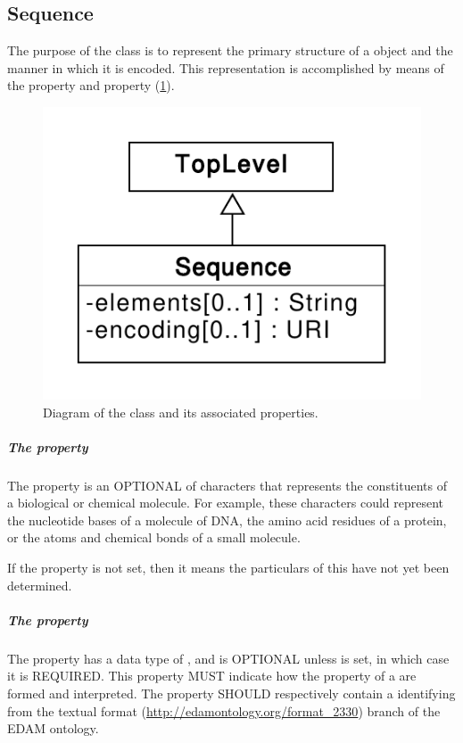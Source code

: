 \subsection{Sequence}
\label{sec:Sequence}
The purpose of the  class is to represent the primary structure of a  object and the manner in which it is encoded. This representation is accomplished  by means of the  property and  property (\ref{uml:sequence}).

\begin{figure}[ht]
\begin{center}
\includegraphics[scale=0.6]{uml/sequence}
\caption[]{Diagram of the  class and its associated properties.}
\label{uml:sequence}
\end{center}
\end{figure}


\subparagraph{The  property}
\label{sec:elements}
The  property is an OPTIONAL  of characters that represents the constituents of a biological or chemical molecule. 
For example, these characters could represent the nucleotide bases of a molecule of DNA, the amino acid residues of a protein, or the atoms and chemical bonds of a small molecule.

If the  property is not set, then it means the particulars of this  have not yet been determined.


\subparagraph{The  property}
\label{sec:encoding}

The  property has a data type of , and is OPTIONAL unless  is set, in which case it is REQUIRED.
This property MUST indicate how the  property of a  are formed and interpreted.
The  property SHOULD respectively contain a  identifying from the textual format (\url{http://edamontology.org/format_2330}) branch of the EDAM ontology.

